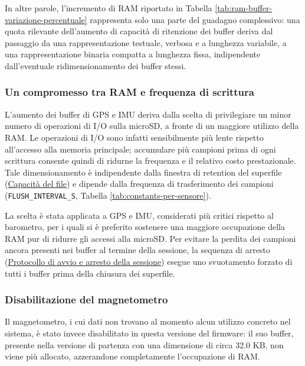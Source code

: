 In altre parole, l'incremento di RAM riportato in
Tabella \ref{tab:ram-buffer-variazione-percentuale} rappresenta solo una
parte del guadagno complessivo: una quota rilevante dell'aumento di
capacità di ritenzione dei buffer deriva dal passaggio da una
rappresentazione testuale, verbosa e a lunghezza variabile, a una
rappresentazione binaria compatta a lunghezza fissa, indipendente
dall'eventuale ridimensionamento dei buffer stessi.

\subsubsection{Un compromesso tra RAM e frequenza di scrittura}
L'aumento dei buffer di GPS e IMU deriva dalla scelta di privilegiare un minor
numero di operazioni di I/O sulla microSD, a fronte di un maggiore utilizzo
della RAM. Le operazioni di I/O sono infatti sensibilmente più lente rispetto
all'accesso alla memoria principale; accumulare più campioni prima di ogni
scrittura consente quindi di ridurne la frequenza e il relativo costo
prestazionale. Tale dimensionamento è indipendente dalla finestra di retention
del superfile
(\hyperref[subsec:capacita_superfile]{Capacità del file}) e dipende dalla
frequenza di trasferimento dei campioni
(\texttt{FLUSH\_INTERVAL\_S}, Tabella \ref{tab:constants-per-sensore}).

La scelta è stata applicata a GPS e IMU, considerati più critici rispetto al
barometro, per i quali si è preferito sostenere una maggiore occupazione della
RAM pur di ridurre gli accessi alla microSD. Per evitare la perdita dei campioni
ancora presenti nei buffer al termine della sessione, la sequenza di arresto
(\hyperref[sec:avvio-arresto]{Protocollo di avvio e arresto della sessione})
esegue uno svuotamento forzato di tutti i buffer prima della chiusura dei
superfile.

\subsubsection{Disabilitazione del magnetometro}
Il magnetometro, i cui dati non trovano al momento alcun utilizzo concreto
nel sistema, è stato invece disabilitato in questa versione del firmware: il
suo buffer, presente nella versione di partenza con una dimensione di circa
32.0 KB, non viene più allocato, azzerandone completamente l'occupazione di
RAM.

